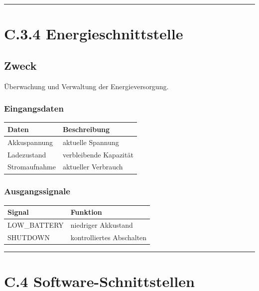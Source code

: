 \documentclass[
]{article}
\begin{document}
\begin{center}\rule{0.5\linewidth}{0.5pt}\end{center}

\section{C.3.4 Energieschnittstelle}\label{c.3.4-energieschnittstelle}

\subsection{Zweck}\label{zweck-5}

Überwachung und Verwaltung der Energieversorgung.

\subsubsection{Eingangsdaten}\label{eingangsdaten}

\begin{longtable}[]{@{}ll@{}}
\toprule\noalign{}
Daten & Beschreibung \\
\midrule\noalign{}
\endhead
\bottomrule\noalign{}
\endlastfoot
Akkuspannung & aktuelle Spannung \\
Ladezustand & verbleibende Kapazität \\
Stromaufnahme & aktueller Verbrauch \\
\end{longtable}

\subsubsection{Ausgangssignale}\label{ausgangssignale}

\begin{longtable}[]{@{}ll@{}}
\toprule\noalign{}
Signal & Funktion \\
\midrule\noalign{}
\endhead
\bottomrule\noalign{}
\endlastfoot
LOW\_BATTERY & niedriger Akkustand \\
SHUTDOWN & kontrolliertes Abschalten \\
\end{longtable}

\begin{center}\rule{0.5\linewidth}{0.5pt}\end{center}

\section{C.4 Software-Schnittstellen}\label{c.4-software-schnittstellen}
\end{document}

